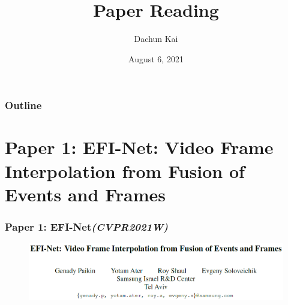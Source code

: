 \documentclass[aspectratio=43]{beamer}
\title{Paper Reading}
\author{Dachun Kai}
\institute{USTC}
\date{August 6, 2021}
\begin{document}
    \frame{\titlepage}
    
    \begin{frame}
    	\frametitle{Outline}
    	\tableofcontents
    \end{frame}
	
	\section{Paper 1: EFI-Net: Video Frame Interpolation from Fusion of Events and Frames}
	
	\begin{frame}
		\frametitle{Paper 1: EFI-Net\textit{(CVPR2021W)}}
		\begin{figure}
			\centering\includegraphics[width=0.95\linewidth]{images/EFI_NET_paper.png}
		\end{figure}
	\end{frame}
\end{document}
